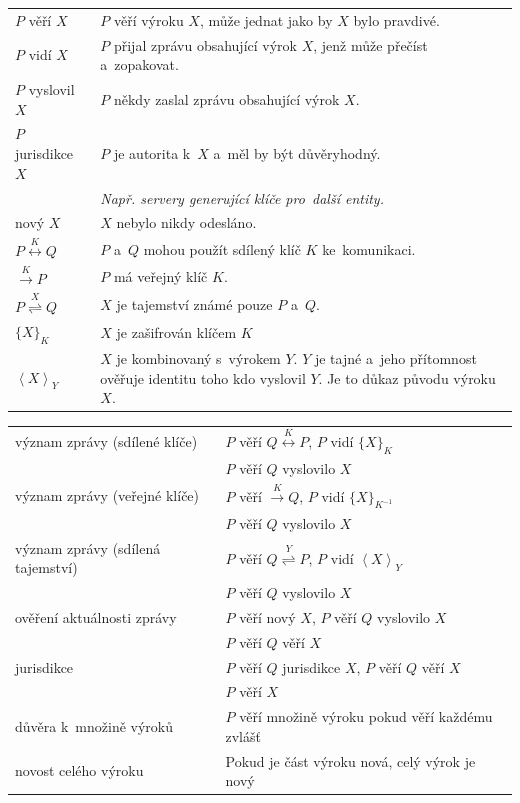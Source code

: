 \begin{tabularx}{\textwidth}{lX}
$P$ věří $X$ & $P$ věří výroku $X$, může jednat jako by $X$ bylo pravdivé. \\
$P$ vidí $X$ & $P$ přijal zprávu obsahující výrok $X$, jenž může přečíst a~zopakovat. \\
$P$ vyslovil $X$ & $P$ někdy zaslal zprávu obsahující výrok $X$. \\
$P$ jurisdikce $X$ & $P$ je autorita k~$X$ a~měl by být důvěryhodný. \\
& \emph{Např. servery generující klíče pro~další entity.} \\
nový $X$ & $X$ nebylo nikdy odesláno. \\
$P \stackrel{K}{\leftrightarrow} Q$ & $P$ a~$Q$ mohou použít sdílený klíč $K$ ke~komunikaci. \\
$\stackrel{K}{\rightarrow} P$ & $P$ má veřejný klíč $K$. \\
$P \stackrel{X}{\rightleftharpoons} Q$ & $X$ je tajemství známé pouze $P$ a~$Q$. \\
$\{X\}_K$ & $X$ je zašifrován klíčem $K$ \\
$\left<X\right>_Y$ & $X$ je kombinovaný s~výrokem $Y$. $Y$ je tajné a~jeho přítomnost ověřuje identitu toho kdo vyslovil $Y$. Je to důkaz původu výroku $X$. \\
\end{tabularx}

\begin{tabular}{ll}
význam zprávy (sdílené klíče)
& $P$ věří $Q \stackrel{K}{\leftrightarrow} P$, $P$ vidí $\{X\}_K$ \\
& $P$ věří $Q$ vyslovilo $X$ \\
význam zprávy (veřejné klíče) & $P$ věří $\stackrel{K}{\rightarrow} Q$, $P$ vidí $\{X\}_{K^{-1}}$ \\
& $P$ věří $Q$ vyslovilo $X$ \\
význam zprávy (sdílená tajemství) & $P$ věří $Q \stackrel{Y}{\rightleftharpoons} P$, $P$ vidí $\left<X\right>_Y$ \\
& $P$ věří $Q$ vyslovilo $X$ \\

ověření aktuálnosti zprávy
& $P$ věří nový $X$, $P$ věří $Q$ vyslovilo $X$ \\
& $P$ věří $Q$ věří $X$ \\

jurisdikce
& $P$ věří $Q$ jurisdikce $X$, $P$ věří $Q$ věří $X$ \\
& $P$ věří $X$ \\

důvěra k~množině výroků
& $P$ věří množině výroku pokud věří každému zvlášť \\

novost celého výroku
& Pokud je část výroku nová, celý výrok je nový \\
\end{tabular}

